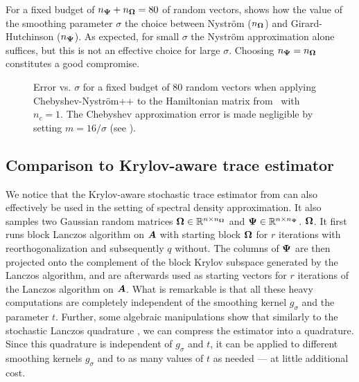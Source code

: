 %    

For a fixed budget of $n_{\boldsymbol{\Psi}} + n_{\boldsymbol{\Omega}} = 80$ of random vectors,  shows how the value of the smoothing parameter $\sigma$ the choice between Nyström ($n_{\boldsymbol{\Omega}}$) and 
Girard-Hutchinson ($n_{\boldsymbol{\Psi}}$). As expected, for small $\sigma$ the Nyström approximation alone suffices, but 
this is not an effective choice for large $\sigma$. Choosing $n_{\boldsymbol{\Psi}} = n_{\boldsymbol{\Omega}}$ constitutes a good compromise.


\begin{figure}[ht]
    \centering
    
    \caption{Error vs. $\sigma$ for a fixed budget of $80$ random vectors 
    when applying  Chebyshev-Nyström++ to the Hamiltonian matrix from~ with $n_c = 1$.
The Chebyshev approximation error is made negligible by setting $m=16 / \sigma$ (see ).}
    \label{fig:distribution}
\end{figure}

\subsection{Comparison to Krylov-aware trace estimator}
\label{subsec:krylov-aware}

We notice that the Krylov-aware stochastic trace estimator from \cite[Algorithm 3.1]{chen-2023-krylovaware-stochastic} can also effectively be used in the setting of spectral density approximation. It also samples two Gaussian random matrices $\boldsymbol{\Omega} \in \mathbb{R}^{n \times n_{\boldsymbol{\Omega}}}$ and $\boldsymbol{\Psi} \in \mathbb{R}^{n \times n_{\boldsymbol{\Psi}}}$. $\boldsymbol{\Omega}$. It first runs block Lanczos algorithm on $\boldsymbol{A}$ with starting block $\boldsymbol{\Omega}$ for $r$ iterations with reorthogonalization and subsequently $q$ without. The columns of $\boldsymbol{\Psi}$ are then projected onto the complement of the block Krylov subspace generated by the Lanczos algorithm, and are afterwards used as starting vectors for $r$ iterations of the Lanczos algorithm on $\boldsymbol{A}$. What is remarkable is that all these heavy computations are completely independent of the smoothing kernel $g_{\sigma}$ and the parameter $t$. Further, some algebraic manipulations show that similarly to the stochastic Lanczos quadrature \cite[Section 3]{ubaru-2017-fast-estimation}, we can compress the estimator into a quadrature. Since this quadrature is independent of $g_{\sigma}$ and $t$, it can be applied to different smoothing kernels $g_{\sigma}$ and to as many values of $t$ as needed --- at little additional cost.


